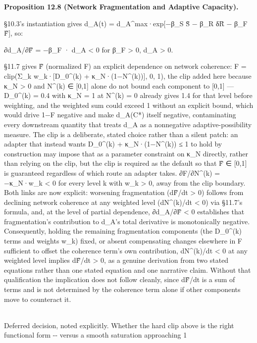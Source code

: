 \documentclass[
]{article}
\begin{document}
\textbf{Proposition 12.8 (Network Fragmentation and Adaptive Capacity).}

§10.3's instantiation gives d\_A(t) = d\_A\^{}max·exp{[}−β\_S S̃ − β\_R
δR̃ − β\_F F̃{]}, so:

∂d\_A/∂F̃ = −β\_F · d\_A \textless{} 0 for β\_F \textgreater{} 0, d\_A
\textgreater{} 0.

§11.7 gives F̃ (normalized F) an explicit dependence on network
coherence: F = clip(Σ\_k w\_k·{[}D\_0\^{}(k) + κ\_N·(1−N\^{}(k)){]}, 0,
1), the clip added here because κ\_N \textgreater{} 0 and N\^{}(k) ∈
{[}0,1{]} alone do not bound each component to {[}0,1{]} --- D\_0\^{}(k)
= 0.4 with κ\_N = 1 at N\^{}(k) = 0 already gives 1.4 for that level
before weighting, and the weighted sum could exceed 1 without an
explicit bound, which would drive 1−F negative and make d\_A(C*) itself
negative, contaminating every downstream quantity that treats d\_A as a
nonnegative adaptive-possibility measure. The clip is a deliberate,
stated choice rather than a silent patch: an adapter that instead wants
D\_0\^{}(k) + κ\_N·(1−N\^{}(k)) ≤ 1 to hold by construction may impose
that as a parameter constraint on κ\_N directly, rather than relying on
the clip, but the clip is required as the default so that F̃ ∈ {[}0,1{]}
is guaranteed regardless of which route an adapter takes. ∂F/∂N\^{}(k) =
−κ\_N·w\_k \textless{} 0 for every level k with w\_k \textgreater{} 0,
away from the clip boundary. Both links are now explicit: worsening
fragmentation (dF̃/dt \textgreater{} 0) follows from declining network
coherence at any weighted level (dN\^{}(k)/dt \textless{} 0) via §11.7's
formula, and, at the level of partial dependence, ∂d\_A/∂F̃ \textless{} 0
establishes that fragmentation's contribution to d\_A's total derivative
is monotonically negative. Consequently, holding the remaining
fragmentation components (the D\_0\^{}(k) terms and weights w\_k) fixed,
or absent compensating changes elsewhere in F sufficient to offset the
coherence term's own contribution, dN\^{}(k)/dt \textless{} 0 at any
weighted level implies dF̃/dt \textgreater{} 0, as a genuine derivation
from two stated equations rather than one stated equation and one
narrative claim. Without that qualification the implication does not
follow cleanly, since dF̃/dt is a sum of terms and is not determined by
the coherence term alone if other components move to counteract it.\\
\strut \\
Deferred decision, noted explicitly. Whether the hard clip above is the
right functional form -\/- versus a smooth saturation approaching 1
\end{document}
